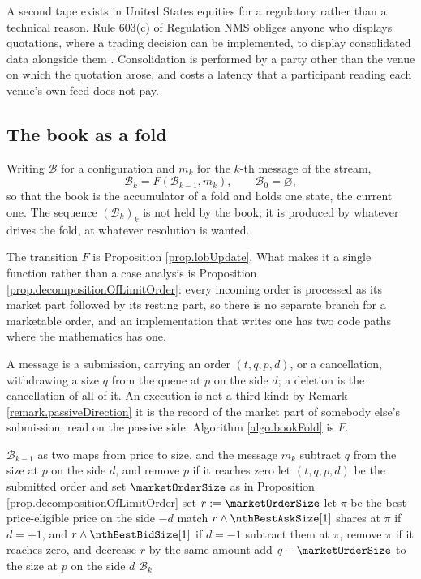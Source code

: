 A second tape exists in United States equities for a regulatory rather than a technical
reason.
Rule 603(c) of Regulation NMS obliges anyone who displays quotations,
where a trading decision can be implemented,
to display consolidated data alongside them \cite{SEC05reg}.
Consolidation is performed by a party other than the venue on which the quotation arose,
and costs a latency that a participant reading each venue's own feed does not pay.

\subsection{The book as a fold}

Writing $\mathcal{B}$ for a configuration and $m_k$ for the $k$-th message of the stream,
\begin{equation}\label{eq.bookFold}
 \mathcal{B}_{k} = F(\mathcal{B}_{k-1}, m_k),
 \qquad \mathcal{B}_0 = \varnothing ,
\end{equation}
so that the book is the accumulator of a fold and holds one state, the current one.
The sequence $(\mathcal{B}_k)_k$ is not held by the book;
it is produced by whatever drives the fold, at whatever resolution is wanted.

The transition $F$ is Proposition \ref{prop.lobUpdate}.
What makes it a single function rather than a case analysis is
Proposition \ref{prop.decompositionOfLimitOrder}:
every incoming order is processed as its market part followed by its resting part,
so there is no separate branch for a marketable order,
and an implementation that writes one has two code paths where the mathematics has one.

A message is a submission, carrying an order $(t,q,p,d)$,
or a cancellation, withdrawing a size $q$ from the queue at $p$ on the side $d$;
a deletion is the cancellation of all of it.
An execution is not a third kind:
by Remark \ref{remark.passiveDirection} it is the record of the market part of somebody
else's submission, read on the passive side.
Algorithm \ref{algo.bookFold} is $F$.

\begin{algorithm}[h!]
 \caption{{The fold of the message stream into the aggregated book}}
 \label{algo.bookFold}
 \begin{algorithmic}[5]
  \REQUIRE $\mathcal{B}_{k-1}$ as two maps from price to size, and the message $m_k$
  \STATE subtract $q$ from the size at $p$ on the side $d$, and remove $p$ if it reaches zero
  \ELSE
  \STATE let $(t,q,p,d)$ be the submitted order and set
         $\marketOrderSize$ as in Proposition \ref{prop.decompositionOfLimitOrder}
  \STATE set $r := \marketOrderSize$
  \STATE let $\pi$ be the best price-eligible price on the side $-d$
  \STATE match $r \wedge \nthBestAskSize[1]$ shares at $\pi$ if $d=+1$, and
         $r \wedge \nthBestBidSize[1]$ if $d=-1$
  \STATE subtract them at $\pi$, remove $\pi$ if it reaches zero,
         and decrease $r$ by the same amount
  \ENDWHILE
  \STATE add $q - \marketOrderSize$ to the size at $p$ on the side $d$
  \ENDIF
  \RETURN $\mathcal{B}_{k}$
 \end{algorithmic}
\end{algorithm}

